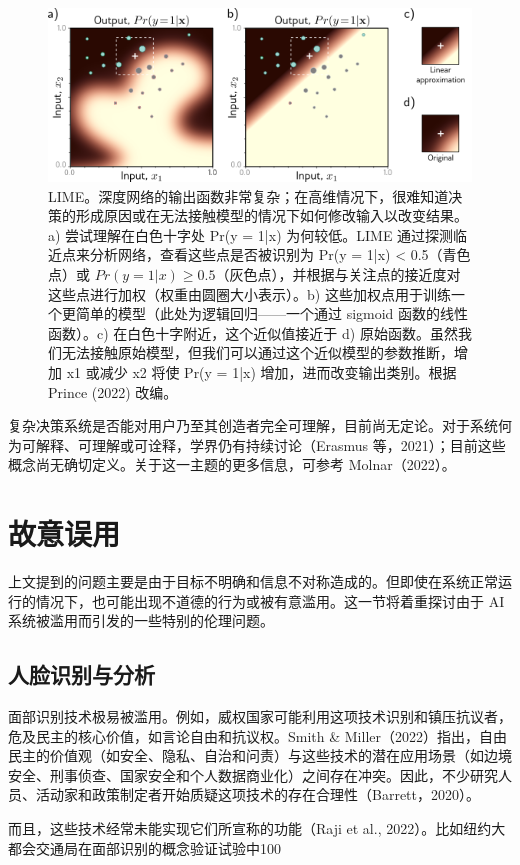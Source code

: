 \begin{figure}[ht!]
\centering
\includegraphics[width=0.7\linewidth]{png/chapter21/EthicsLIME.png}
\caption{LIME。深度网络的输出函数非常复杂；在高维情况下，很难知道决策的形成原因或在无法接触模型的情况下如何修改输入以改变结果。a) 尝试理解在白色十字处 Pr(y = 1|x) 为何较低。LIME 通过探测临近点来分析网络，查看这些点是否被识别为 Pr(y = 1|x) < 0.5（青色点）或 \(Pr(y = 1|x) \geq 0.5\)（灰色点），并根据与关注点的接近度对这些点进行加权（权重由圆圈大小表示）。b) 这些加权点用于训练一个更简单的模型（此处为逻辑回归——一个通过 sigmoid 函数的线性函数）。c) 在白色十字附近，这个近似值接近于 d) 原始函数。虽然我们无法接触原始模型，但我们可以通过这个近似模型的参数推断，增加 x1 或减少 x2 将使 Pr(y = 1|x) 增加，进而改变输出类别。根据 Prince (2022) 改编。}
\end{figure}

复杂决策系统是否能对用户乃至其创造者完全可理解，目前尚无定论。对于系统何为可解释、可理解或可诠释，学界仍有持续讨论（Erasmus 等，2021）；目前这些概念尚无确切定义。关于这一主题的更多信息，可参考 Molnar（2022）。

\section{故意误用}
上文提到的问题主要是由于目标不明确和信息不对称造成的。但即使在系统正常运行的情况下，也可能出现不道德的行为或被有意滥用。这一节将着重探讨由于 AI 系统被滥用而引发的一些特别的伦理问题。

\subsection{人脸识别与分析}
面部识别技术极易被滥用。例如，威权国家可能利用这项技术识别和镇压抗议者，危及民主的核心价值，如言论自由和抗议权。Smith \& Miller（2022）指出，自由民主的价值观（如安全、隐私、自治和问责）与这些技术的潜在应用场景（如边境安全、刑事侦查、国家安全和个人数据商业化）之间存在冲突。因此，不少研究人员、活动家和政策制定者开始质疑这项技术的存在合理性（Barrett，2020）。

而且，这些技术经常未能实现它们所宣称的功能（Raji et al., 2022）。比如纽约大都会交通局在面部识别的概念验证试验中100%

